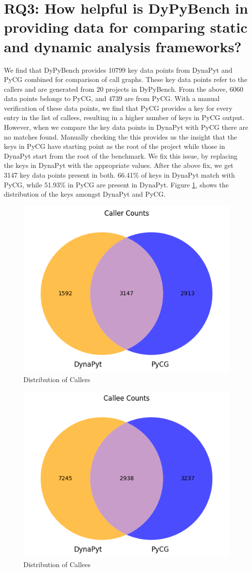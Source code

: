 \section{RQ3: How helpful is DyPyBench in providing data for comparing static and dynamic analysis frameworks?}

We find that DyPyBench provides 10799 key data points from DynaPyt and PyCG combined for comparison of call graphs.
These key data points refer to the callers and are generated from 20 projects in DyPyBench.
From the above, 6060 data points belongs to PyCG, and 4739 are from PyCG.
With a manual verification of these data points, we find that PyCG provides a key for every entry in the list of callees, resulting in a higher number of keys in PyCG output.
However, when we compare the key data points in DynaPyt with PyCG there are no matches found.
Manually checking the this provides us the insight that the keys in PyCG have starting point as the root of the project while those in DynaPyt start from the root of the benchmark.
We fix this issue, by replacing the keys in DynaPyt with the appropriate values.
After the above fix, we get 3147 key data points present in both.
66.41\% of keys in DynaPyt match with PyCG, while 51.93\% in PyCG are present in DynaPyt.
Figure \ref{fig:caller counts}, shows the distribution of the keys amongst DynaPyt and PyCG.
\begin{figure}[ht]
    \centering
    \includegraphics[width=0.5\linewidth]{figures/evaluation/callercounts.png}
    \caption[Distribution of Callers]{\label{fig:caller counts}Distribution of Callers }
\end{figure}
\begin{figure}[ht]
    \centering
    \includegraphics[width=0.5\linewidth]{figures/evaluation/calleecounts.png}
    \caption[Distribution of Callees]{\label{fig:callee_counts}Distribution of Callees}
\end{figure}

